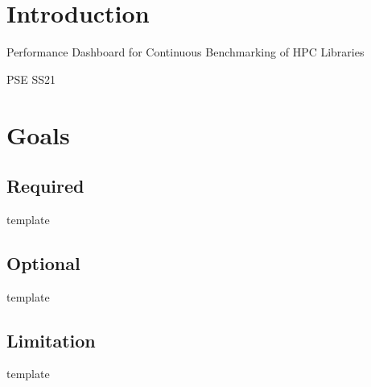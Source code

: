 \section{Introduction}

Performance Dashboard for Continuous Benchmarking of HPC Libraries

PSE SS21

\section{Goals}

\subsection{Required}


template

\subsection{Optional}


template

\subsection{Limitation}


template
